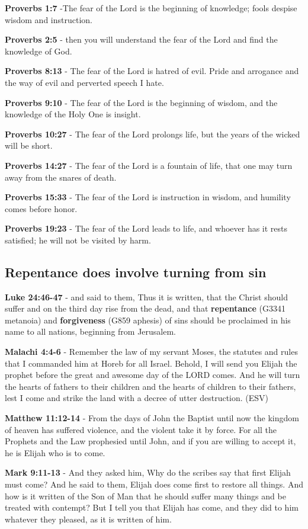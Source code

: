 \documentclass[11pt]{article}
\begin{document}
\textbf{Proverbs 1:7} -The fear of the Lord is the beginning of knowledge; fools despise wisdom and instruction.

\textbf{Proverbs 2:5} - then you will understand the fear of the Lord and find the knowledge of God.

\textbf{Proverbs 8:13} - The fear of the Lord is hatred of evil. Pride and arrogance and the way of evil and perverted speech I hate.

\textbf{Proverbs 9:10} - The fear of the Lord is the beginning of wisdom, and the knowledge of the Holy One is insight.

\textbf{Proverbs 10:27} - The fear of the Lord prolongs life, but the years of the wicked will be short.

\textbf{Proverbs 14:27} - The fear of the Lord is a fountain of life, that one may turn away from the snares of death.

\textbf{Proverbs 15:33} - The fear of the Lord is instruction in wisdom, and humility comes before honor.

\textbf{Proverbs 19:23} - The fear of the Lord leads to life, and whoever has it rests satisfied; he will not be visited by harm.

\subsection{Repentance does involve turning from sin}
\label{sec:orgbbced86}
\textbf{Luke 24:46-47} - and said to them, Thus it is written, that the Christ should suffer and on the third day rise from the dead, and that \textbf{repentance} (G3341 metanoia) and \textbf{forgiveness} (G859 aphesis) of sins should be proclaimed in his name to all nations, beginning from Jerusalem.

\textbf{Malachi 4:4-6} - Remember the law of my servant Moses, the statutes and rules that I commanded him at Horeb for all Israel. Behold, I will send you Elijah the prophet before the great and awesome day of the LORD comes. And he will turn the hearts of fathers to their children and the hearts of children to their fathers, lest I come and strike the land with a decree of utter destruction. (ESV)

\textbf{Matthew 11:12-14} - From the days of John the Baptist until now the kingdom of heaven has suffered violence, and the violent take it by force. For all the Prophets and the Law prophesied until John, and if you are willing to accept it, he is Elijah who is to come.

\textbf{Mark 9:11-13} - And they asked him, Why do the scribes say that first Elijah must come? And he said to them, Elijah does come first to restore all things. And how is it written of the Son of Man that he should suffer many things and be treated with contempt? But I tell you that Elijah has come, and they did to him whatever they pleased, as it is written of him.
\end{document}
